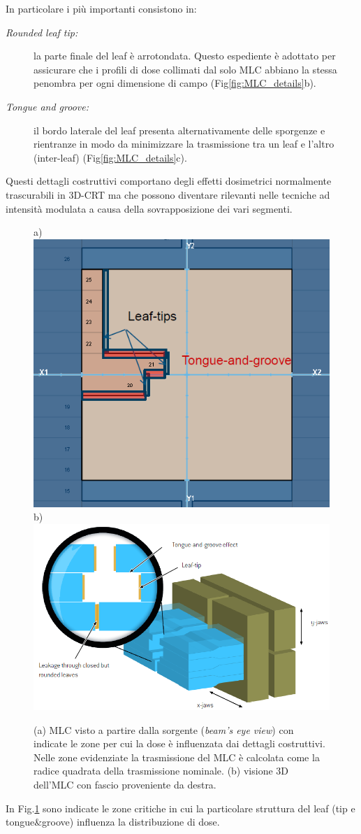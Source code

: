 In particolare i più importanti consistono in:
\begin{description}
\item[\textit{Rounded leaf tip:}] la parte finale del leaf è arrotondata. Questo espediente è adottato per assicurare che i profili di dose collimati dal solo MLC abbiano la stessa penombra per ogni dimensione di campo \cite{Galvin1993a} (Fig\ref{fig:MLC_details}b).
\item[\textit{Tongue and groove:}] il bordo laterale del leaf presenta alternativamente delle sporgenze e rientranze in modo da minimizzare la trasmissione tra un leaf e l'altro (inter-leaf) (Fig\ref{fig:MLC_details}c).
\end{description}

Questi dettagli costruttivi comportano degli effetti dosimetrici normalmente trascurabili in 3D-CRT ma che possono diventare rilevanti nelle tecniche ad intensità modulata a causa della sovrapposizione dei vari segmenti.
\begin{figure}[!t]
\centering
a)\includegraphics[width=.35\textwidth]{./cap2/MLC_tip-tg.png}
b)\includegraphics[width=.5\textwidth]{./cap2/MLC_tip-tg_3D.png}
\caption{(a) MLC visto a partire dalla sorgente (\textit{beam's eye view}) con indicate le zone per cui la dose è influenzata dai dettagli costruttivi. Nelle zone evidenziate la trasmissione del MLC è calcolata come la radice quadrata della trasmissione nominale. (b) visione 3D dell'MLC con fascio proveniente da destra.}
\label{fig:MLC_Regions}
\end{figure}
In Fig.\ref{fig:MLC_Regions} sono indicate le zone critiche in cui la particolare struttura del leaf (tip e tongue\&{}groove) influenza la distribuzione di dose.\\
